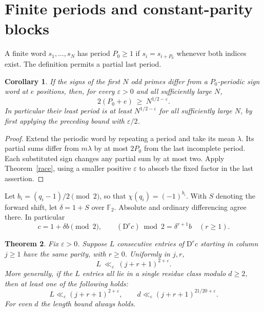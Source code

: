\documentclass[11pt,a4paper]{article}
\newtheorem{theorem}{Theorem}
\newtheorem{corollary}[theorem]{Corollary}
\newcommand{\F}{\mathbb F_2}
\newcommand{\eps}{\varepsilon}
\newcommand{\dd}{\mathrm D}
\begin{document}
\section{Finite periods and constant-parity blocks}
A finite word $s_1,\ldots,s_N$ has period $P_0\ge1$ if $s_i=s_{i+P_0}$ whenever both indices exist. The definition permits a partial last period.
\begin{corollary}\label{period}
If the signs of the first $N$ odd primes differ from a $P_0$-periodic sign word at $e$ positions, then, for every $\eps>0$ and all sufficiently large $N$,
\[
                        2(P_0+e)\ \ge\ N^{1/2-\eps}.
\]
In particular their least period is at least $N^{1/2-\eps}$ for all sufficiently large $N$, by first applying the preceding bound with $\eps/2$.
\end{corollary}
\begin{proof}
Extend the periodic word by repeating a period and take its mean $\lambda$. Its partial sums differ from $m\lambda$ by at most $2P_0$ from the last incomplete period. Each substituted sign changes any partial sum by at most two. Apply Theorem~\ref{race}, using a smaller positive $\eps$ to absorb the fixed factor in the last assertion.
\end{proof}
Let $b_i=(q_i-1)/2\pmod 2$, so that $\chi(q_i)=(-1)^{b_i}$. With $S$ denoting the forward shift, let $\delta=1+S$ over $\F$. Absolute and ordinary differencing agree there. In particular
\begin{equation}\label{bin}
 c=1+\delta b\pmod2,\qquad (\dd^r c)\bmod2=\delta^{r+1}b\quad(r\ge1).
\end{equation}
\begin{theorem}\label{strip}
Fix $\eps>0$. Suppose $L$ consecutive entries of $\dd^r c$ starting in column $j\ge1$ have the same parity, with $r\ge0$. Uniformly in $j,r$,
\[
                     L\ \ll_\eps\ (j+r+1)^{2+\eps}.
\]
More generally, if the $L$ entries all lie in a single residue class modulo $d\ge2$, then at least one of the following holds:
\[
 L\ll_\eps(j+r+1)^{2+\eps},\qquad
 d\ll_\eps(j+r+1)^{21/20+\eps}.
\]
For even $d$ the length bound always holds.
\end{theorem}
\end{document}
